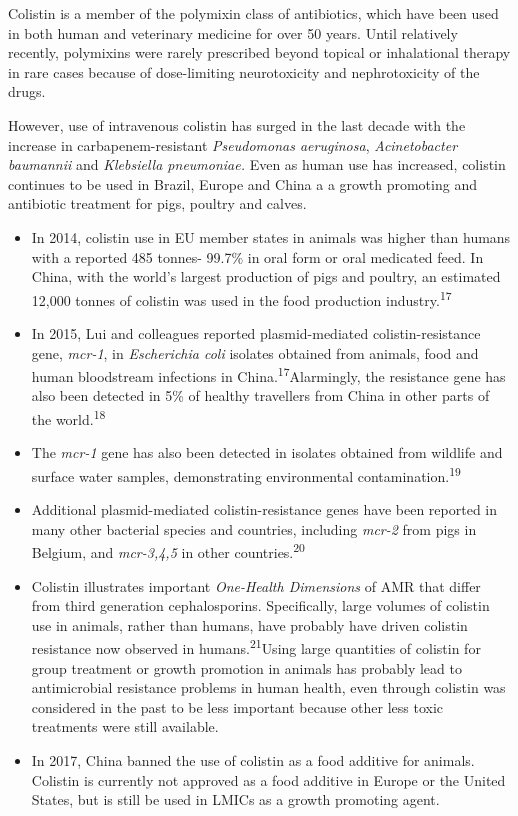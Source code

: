 \documentclass[
]{book}
\begin{document}
Colistin is a member of the polymixin class of antibiotics, which have been used in both human and veterinary medicine for over 50 years. Until relatively recently, polymixins were rarely prescribed beyond topical or inhalational therapy in rare cases because of dose-limiting neurotoxicity and nephrotoxicity of the drugs.

However, use of intravenous colistin has surged in the last decade with the increase in carbapenem-resistant \emph{Pseudomonas aeruginosa}, \emph{Acinetobacter baumannii} and \emph{Klebsiella pneumoniae.} Even as human use has increased, colistin continues to be used in Brazil, Europe and China a a growth promoting and antibiotic treatment for pigs, poultry and calves.

\begin{itemize}
\item
  In 2014, colistin use in EU member states in animals was higher than humans with a reported 485 tonnes- 99.7\% in oral form or oral medicated feed. In China, with the world's largest production of pigs and poultry, an estimated 12,000 tonnes of colistin was used in the food production industry.\textsuperscript{17}
\item
  In 2015, Lui and colleagues reported plasmid-mediated colistin-resistance gene, \emph{mcr-1}, in \emph{Escherichia coli} isolates obtained from animals, food and human bloodstream infections in China.\textsuperscript{17}Alarmingly, the resistance gene has also been detected in 5\% of healthy travellers from China in other parts of the world.\textsuperscript{18}
\item
  The \emph{mcr-1} gene has also been detected in isolates obtained from wildlife and surface water samples, demonstrating environmental contamination.\textsuperscript{19}
\item
  Additional plasmid-mediated colistin-resistance genes have been reported in many other bacterial species and countries, including \emph{mcr-2} from pigs in Belgium, and \emph{mcr-3,4,5} in other countries.\textsuperscript{20}
\item
  Colistin illustrates important \emph{One-Health Dimensions} of AMR that differ from third generation cephalosporins. Specifically, large volumes of colistin use in animals, rather than humans, have probably have driven colistin resistance now observed in humans.\textsuperscript{21}Using large quantities of colistin for group treatment or growth promotion in animals has probably lead to antimicrobial resistance problems in human health, even through colistin was considered in the past to be less important because other less toxic treatments were still available.
\item
  In 2017, China banned the use of colistin as a food additive for animals. Colistin is currently not approved as a food additive in Europe or the United States, but is still be used in LMICs as a growth promoting agent.
\end{itemize}
\end{document}
